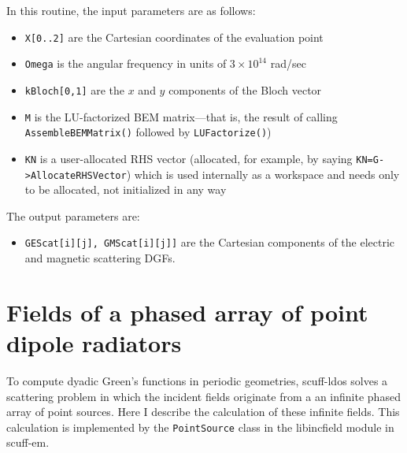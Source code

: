 \documentclass[letterpaper]{article}
\begin{document}
In this routine, the input parameters are as follows:

\begin{itemize}
 \item \texttt{X[0..2]} are the Cartesian coordinates of the evaluation point
 \item \texttt{Omega} is the angular frequency in units of $3\times 10^{14}$ rad/sec
 \item \texttt{kBloch[0,1]} are the $x$ and $y$ components of the Bloch vector
 \item \texttt{M} is the LU-factorized BEM matrix---that is, the result of 
       calling \texttt{AssembleBEMMatrix()} followed by \texttt{LUFactorize()})
 \item \texttt{KN} is a user-allocated RHS vector (allocated, for example,
       by saying \texttt{KN=G->AllocateRHSVector}) which is used internally
       as a workspace and needs only to be allocated, not initialized in any way
\end{itemize}

The output parameters are:

\begin{itemize}
 \item \texttt{GEScat[i][j], GMScat[i][j]]} are the Cartesian components of the 
       electric and magnetic scattering DGFs.
\end{itemize}

\appendix
\newpage 
\section{Fields of a phased array of point dipole radiators}
\label{DipoleFieldsAppendix}

To compute dyadic Green's functions in periodic geometries,
{\sc scuff-ldos} solves a scattering problem in which the
incident fields originate from a an infinite phased array
of point sources. Here I describe the calculation of these
infinite fields. This calculation is implemented by the 
\texttt{PointSource} 
class in the {\sc libincfield} module in {\sc scuff-em}.
\end{document}
